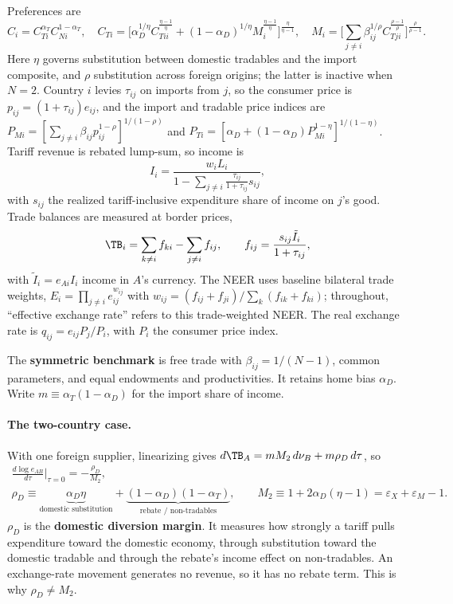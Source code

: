 Preferences are
\begin{equation}
C_i=C_{Ti}^{\alpha_T}C_{Ni}^{1-\alpha_T},\quad
C_{Ti}=\Big[\alpha_D^{1/\eta}C_{Tii}^{\frac{\eta-1}{\eta}}+(1-\alpha_D)^{1/\eta}M_i^{\frac{\eta-1}{\eta}}\Big]^{\frac{\eta}{\eta-1}},\quad
M_i=\Big[\textstyle\sum_{j\neq i}\beta_{ij}^{1/\rho}C_{Tji}^{\frac{\rho-1}{\rho}}\Big]^{\frac{\rho}{\rho-1}}.
\label{eq:prefs}
\end{equation}
Here $\eta$ governs substitution between domestic tradables and the import composite, and $\rho$ substitution across foreign origins; the latter is inactive when $N=2$. Country $i$ levies $\tau_{ij}$ on imports from $j$, so the consumer price is $p_{ij}=(1+\tau_{ij})e_{ij}$, and the import and tradable price indices are $P_{Mi}=[\sum_{j\neq i}\beta_{ij}p_{ij}^{1-\rho}]^{1/(1-\rho)}$ and $P_{Ti}=[\alpha_D+(1-\alpha_D)P_{Mi}^{1-\eta}]^{1/(1-\eta)}$. Tariff revenue is rebated lump-sum, so income is
\begin{equation}
I_i=\frac{w_iL_i}{1-\sum_{j\neq i}\frac{\tau_{ij}}{1+\tau_{ij}}s_{ij}},
\label{eq:income}
\end{equation}
with $s_{ij}$ the realized tariff-inclusive expenditure share of income on $j$'s good. Trade balances are measured at border prices,
\begin{equation}
\TB_i=\sum_{k\neq i}f_{ki}-\sum_{j\neq i}f_{ij},\qquad f_{ij}=\frac{s_{ij}\tilde I_i}{1+\tau_{ij}},
\label{eq:tb}
\end{equation}
with $\tilde I_i=e_{Ai}I_i$ income in $A$'s currency. The NEER uses baseline bilateral trade weights, $E_i=\prod_{j\neq i}e_{ij}^{w_{ij}}$ with $w_{ij}=(f_{ij}+f_{ji})/\sum_k(f_{ik}+f_{ki})$; throughout, ``effective exchange rate'' refers to this trade-weighted NEER. The real exchange rate is $q_{ij}=e_{ij}P_j/P_i$, with $P_i$ the consumer price index.

The \textbf{symmetric benchmark} is free trade with $\beta_{ij}=1/(N-1)$, common parameters, and equal endowments and productivities. It retains home bias $\alpha_D$. Write $m\equiv\alpha_T(1-\alpha_D)$ for the import share of income.

\paragraph{The two-country case.} With one foreign supplier, linearizing gives $d\TB_A=mM_2\,d\nu_B+m\rho_D\,d\tau$, so
\begin{equation}
\begin{gathered}
\frac{d\log e_{AB}}{d\tau}\bigg|_{\tau=0}=-\frac{\rho_D}{M_2},\\
\rho_D\equiv\underbrace{\alpha_D\eta}_{\text{domestic substitution}}+\underbrace{(1-\alpha_D)(1-\alpha_T)}_{\text{rebate / non-tradables}},\qquad
M_2\equiv1+2\alpha_D(\eta-1)=\varepsilon_X+\varepsilon_M-1.
\end{gathered}
\label{eq:twocountry}
\end{equation}
$\rho_D$ is the \textbf{domestic diversion margin}. It measures how strongly a tariff pulls expenditure toward the domestic economy, through substitution toward the domestic tradable and through the rebate's income effect on non-tradables. An exchange-rate movement generates no revenue, so it has no rebate term. This is why $\rho_D\neq M_2$.

